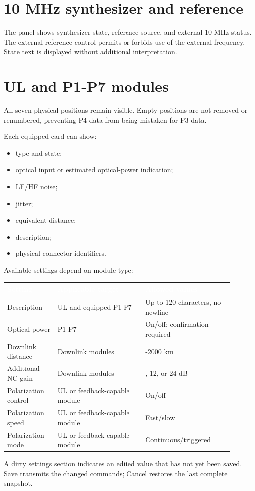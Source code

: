 \documentclass[11pt,a4paper,oneside]{book}
\newcommand{\thead}[1]{\cellcolor{panelblue}\textcolor{white}{\textbf{#1}}}
\begin{document}
\section{10 MHz synthesizer and reference}
The panel shows synthesizer state, reference source, and external 10 MHz status. The external-reference control permits or forbids use of the external frequency. State text is displayed without additional interpretation.

\section{UL and P1-P7 modules}
All seven physical positions remain visible. Empty positions are not removed or renumbered, preventing P4 data from being mistaken for P3 data.

Each equipped card can show:

\begin{itemize}
\item type and state;
\item optical input or estimated optical-power indication;
\item LF/HF noise;
\item jitter;
\item equivalent distance;
\item description;
\item physical connector identifiers.
\end{itemize}
Available settings depend on module type:

\begin{longtable}{|>{\centering\arraybackslash}m{0.20\linewidth}|>{\centering\arraybackslash}m{0.35\linewidth}|>{\centering\arraybackslash}m{0.35\linewidth}|}
\hline
\thead{Setting} & \thead{Applicable target} & \thead{Allowed values} \\
\hline
\endhead
Description & UL and equipped P1-P7 & Up to 120 characters, no newline \\
\hline
Optical power & P1-P7 & On/off; confirmation required \\
\hline
Downlink distance & Downlink modules & 10-2000 km \\
\hline
Additional NC gain & Downlink modules & 0, 12, or 24 dB \\
\hline
Polarization control & UL or feedback-capable module & On/off \\
\hline
Polarization speed & UL or feedback-capable module & Fast/slow \\
\hline
Polarization mode & UL or feedback-capable module & Continuous/triggered \\
\hline
\end{longtable}
A dirty settings section indicates an edited value that has not yet been saved. Save transmits the changed commands; Cancel restores the last complete snapshot.
\end{document}
